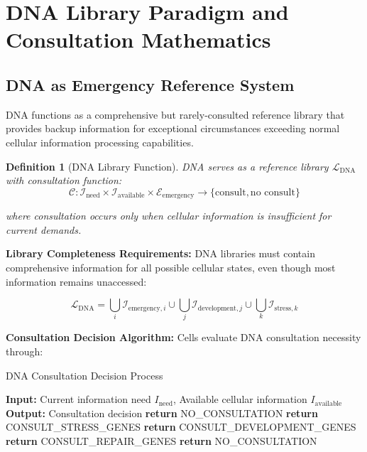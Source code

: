 \documentclass[12pt,a4paper]{article}
\newtheorem{definition}[theorem]{Definition}
\begin{document}
\section{DNA Library Paradigm and Consultation Mathematics}

\subsection{DNA as Emergency Reference System}

DNA functions as a comprehensive but rarely-consulted reference library that provides backup information for exceptional circumstances exceeding normal cellular information processing capabilities.

\begin{definition}[DNA Library Function]
DNA serves as a reference library $\mathcal{L}_{\text{DNA}}$ with consultation function:
$$\mathcal{C}: \mathcal{I}_{\text{need}} \times \mathcal{I}_{\text{available}} \times \mathcal{E}_{\text{emergency}} \rightarrow \{\text{consult}, \text{no consult}\}$$

where consultation occurs only when cellular information is insufficient for current demands.
\end{definition}

\textbf{Library Completeness Requirements:}
DNA libraries must contain comprehensive information for all possible cellular states, even though most information remains unaccessed:

$$\mathcal{L}_{\text{DNA}} = \bigcup_{i} \mathcal{I}_{\text{emergency},i} \cup \bigcup_{j} \mathcal{I}_{\text{development},j} \cup \bigcup_{k} \mathcal{I}_{\text{stress},k}$$

\textbf{Consultation Decision Algorithm:}
Cells evaluate DNA consultation necessity through:

\begin{algorithm}
\caption{DNA Consultation Decision Process}
\begin{algorithmic}
\STATE \textbf{Input:} Current information need $I_{\text{need}}$, Available cellular information $I_{\text{available}}$
\STATE \textbf{Output:} Consultation decision
\STATE
{}
    \STATE \textbf{return} NO\_CONSULTATION
    \STATE \textbf{return} CONSULT\_STRESS\_GENES
    \STATE \textbf{return} CONSULT\_DEVELOPMENT\_GENES
    \STATE \textbf{return} CONSULT\_REPAIR\_GENES
\ELSE
    \STATE \textbf{return} NO\_CONSULTATION
\ENDIF
\end{algorithmic}
\end{algorithm}
\end{document}
